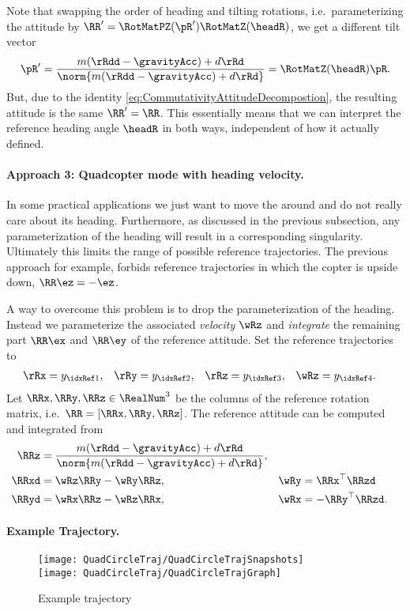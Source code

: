 Note that swapping the order of heading and tilting rotations, i.e.\ parameterizing the attitude by $\RR' = \RotMatPZ(\pR') \RotMatZ(\headR)$, we get a different tilt vector
\begin{align}
 \pR' = \frac{m(\rRdd-\gravityAcc) + d\rRd}{\norm{m(\rRdd-\gravityAcc) + d\rRd}} = \RotMatZ(\headR) \pR.
\end{align}
But, due to the identity \eqref{eq:CommutativityAttitudeDecompostion}, the resulting attitude is the same $\RR' = \RR$.
This essentially means that we can interpret the reference heading angle $\headR$ in both ways, independent of how it actually defined.


\paragraph{Approach 3: Quadcopter mode with heading velocity.}
In some practical applications we just want to move the \Quadcopter around and do not really care about its heading.
Furthermore, as discussed in the previous subsection, any parameterization of the heading will result in a corresponding singularity.
Ultimately this limits the range of possible reference trajectories.
The previous approach for example, forbids reference trajectories in which the copter is upside down, $\RR \ez = -\ez$. 

A way to overcome this problem is to drop the parameterization of the heading.
Instead we parameterize the associated \textit{velocity} $\wRz$ and \textit{integrate} the remaining part $\RR \ex$ and $\RR \ey$ of the reference attitude.
Set the reference trajectories to
\begin{align}
 \rRx &= y_{\idxRef1},&
 \rRy &= y_{\idxRef2},&
 \rRz &= y_{\idxRef3},&
 \wRz &= y_{\idxRef4}.
\end{align}
Let $\RRx, \RRy, \RRz \in \RealNum^3$ be the columns of the reference rotation matrix, i.e.\ $\RR = [\RRx, \RRy, \RRz]$.
The reference attitude can be computed and integrated from
\begin{align}
 \RRz &= \frac{m(\rRdd-\gravityAcc) + d\rRd}{\norm{m(\rRdd-\gravityAcc) + d\rRd}},
\\
 \RRxd &= \wRz \RRy - \wRy \RRz,&
 \wRy &= \RRx^\top \RRzd
\\
 \RRyd &= \wRx \RRz - \wRz \RRx,&
 \wRx &= -\RRy^\top \RRzd.
\end{align}

\paragraph{Example Trajectory.}
\begin{figure}
 \centering
 \texttt{[image: QuadCircleTraj/QuadCircleTrajSnapshots]}
\\
 \texttt{[image: QuadCircleTraj/QuadCircleTrajGraph]}
 \caption{Example trajectory}
\end{figure}



